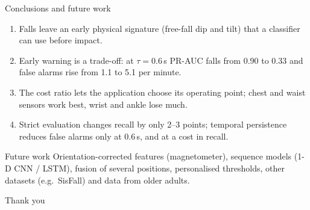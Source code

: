 \documentclass[aspectratio=169,11pt]{beamer}
\begin{document}
\begin{frame}{Conclusions and future work}
\begin{enumerate}\setlength\itemsep{0.7em}
\item Falls leave an early physical signature (free-fall dip and tilt) that a classifier can use before impact.
\item Early warning is a trade-off: at $\tau=0.6$\,s PR-AUC falls from 0.90 to 0.33 and false alarms rise from 1.1 to 5.1 per minute.
\item The cost ratio lets the application choose its operating point; chest and waist sensors work best, wrist and ankle lose much.
\item Strict evaluation changes recall by only 2--3 points; temporal persistence reduces false alarms only at 0.6\,s, and at a cost in recall.
\end{enumerate}
\vspace{0.5em}
\begin{block}{Future work}
\small Orientation-corrected features (magnetometer), sequence models (1-D CNN / LSTM), fusion of several positions, personalised thresholds, other datasets (e.g.\ SisFall) and data from older adults.
\end{block}
\end{frame}

\begin{frame}[plain]
\centering
\vspace{2.5cm}
{\Huge Thank you}\\[0.8em]
\end{frame}
\end{document}
